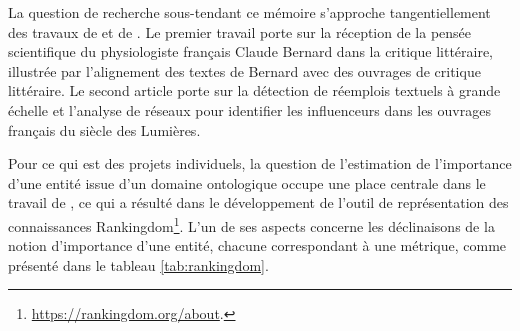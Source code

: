 
La question de recherche sous-tendant ce mémoire s'approche tangentiellement des travaux de \citet{riguet2018impact} et de \citet{roe2023enlightenment}. Le premier travail porte sur la réception de la pensée scientifique du physiologiste français Claude Bernard dans la critique littéraire, illustrée par l'alignement des textes de Bernard avec des ouvrages de critique littéraire. Le second article porte sur la détection de réemplois textuels à grande échelle et l'analyse de réseaux pour identifier les \og{}influenceurs\fg{} dans les ouvrages français du siècle des Lumières.

Pour ce qui est des projets individuels, la question de l'estimation de l'importance d'une entité issue d'un domaine ontologique occupe une place centrale dans le travail de \citet{soulet2024}, ce qui a résulté dans le développement de l'outil de représentation des connaissances Rankingdom\footnote{\url{https://rankingdom.org/about}.}. L'un de ses aspects concerne les déclinaisons de la notion d'importance d'une entité, chacune correspondant à une métrique, comme présenté dans le tableau \ref{tab:rankingdom}.

